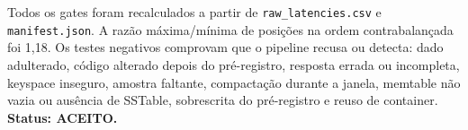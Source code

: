Todos os gates foram recalculados a partir de \texttt{raw\_latencies.csv} e \texttt{manifest.json}. A razão máxima/mínima de posições na ordem contrabalançada foi 1,18. Os testes negativos comprovam que o pipeline recusa ou detecta: dado adulterado, código alterado depois do pré-registro, resposta errada ou incompleta, keyspace inseguro, amostra faltante, compactação durante a janela, memtable não vazia ou ausência de SSTable, sobrescrita do pré-registro e reuso de container. \textbf{Status: ACEITO.}
